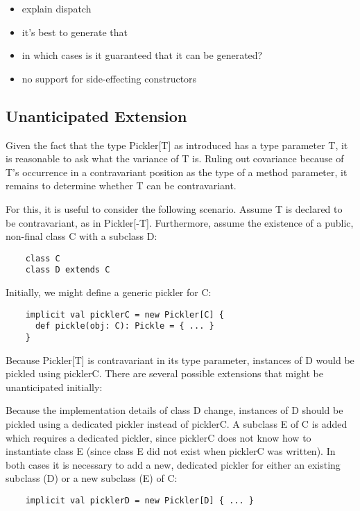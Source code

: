 \documentclass[preprint,10pt]{sigplanconf}
\begin{document}
\begin{itemize}
  \item explain dispatch
  \item it's best to generate that
  \item in which cases is it guaranteed that it can be generated?
    \item no support for side-effecting constructors
\end{itemize}

\subsection{Unanticipated Extension}

Given the fact that the type Pickler[T] as introduced has a type parameter T, it is reasonable to ask what the variance of T is. Ruling out covariance because of T's occurrence in a contravariant position as the type of a method parameter, it remains to determine whether T can be contravariant.

For this, it is useful to consider the following scenario. Assume T is declared to be contravariant, as in Pickler[-T]. Furthermore, assume the existence of a public, non-final class C with a subclass D:

\begin{verbatim}
    class C
    class D extends C
\end{verbatim}

Initially, we might define a generic pickler for C:

\begin{verbatim}
    implicit val picklerC = new Pickler[C] {
      def pickle(obj: C): Pickle = { ... }
    }
\end{verbatim}

Because Pickler[T] is contravariant in its type parameter, instances of D would be pickled using picklerC. There are several possible extensions that might be unanticipated initially:

Because the implementation details of class D change, instances of D should be pickled using a dedicated pickler instead of picklerC.
A subclass E of C is added which requires a dedicated pickler, since picklerC does not know how to instantiate class E (since class E did not exist when picklerC was written).
In both cases it is necessary to add a new, dedicated pickler for either an existing subclass (D) or a new subclass (E) of C:

\begin{verbatim}
    implicit val picklerD = new Pickler[D] { ... }
\end{verbatim}
\end{document}
